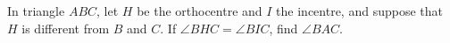 In triangle $ABC$, let $H$ be the orthocentre and $I$ the incentre, and suppose that $H$ is different from $B$ and $C$. If $\angle BHC=\angle BIC$, find $\angle BAC$.
